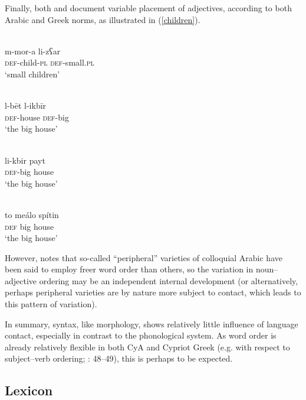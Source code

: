 \documentclass[output=paper]{langsci/langscibook}
\begin{document}
Finally, both \citet{Roth2004} and \citet{Newton1964} document variable placement of adjectives, according to both Arabic and Greek norms, as illustrated in (\ref{children}). 

\ea\label{children}
\ea {}\\
\gll m-mor-a li-zʕar\\
     \textsc{def}-child-\textsc{pl} \textsc{def}-small.\textsc{pl}  \\
\glt ‘small children’

\ex\label{ex:walter:}
\\
\gll l-bēt l-ikbīr\\
     \textsc{def}-house \textsc{def}-big  \\
\glt ‘the big house’

\ex\label{ex:walter:}
\\
\gll li-kbir payt\\
     \textsc{def}-big house  \\
\glt ‘the big house’

\ex\label{ex:walter:}
\\
\gll to meálo spítin\\
     \textsc{def} big house  \\
\glt ‘the big house’
\z
\z

However, \citet{Borg2004} notes that so-called “peripheral” varieties of colloquial Arabic have been said to employ freer word order than others, so the variation in noun–adjective ordering may be an independent internal development (or alternatively, perhaps peripheral varieties are by nature more subject to contact, which leads to this pattern of variation). 

In summary, syntax, like morphology, shows relatively little influence of language contact, especially in contrast to the phonological system. As word order is already relatively flexible in both CyA and Cypriot Greek (e.g. with respect to subject–verb ordering; \citealt{Newton1964}: 48–49), this is perhaps to be expected.

\subsection{Lexicon}
\end{document}
